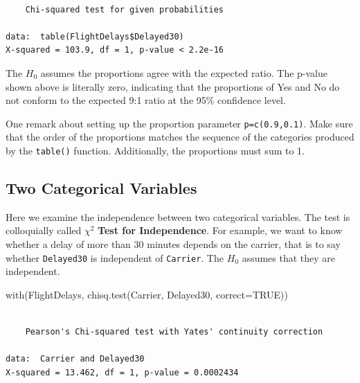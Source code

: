 \documentclass[
  letterpaper,
  DIV=11,
  numbers=noendperiod]{scrreprt}
\newenvironment{Shaded}{\begin{snugshade}}{\end{snugshade}}
\newcommand{\AttributeTok}[1]{\textcolor[rgb]{0.40,0.45,0.13}{#1}}
\newcommand{\ConstantTok}[1]{\textcolor[rgb]{0.56,0.35,0.01}{#1}}
\newcommand{\FloatTok}[1]{\textcolor[rgb]{0.68,0.00,0.00}{#1}}
\newcommand{\FunctionTok}[1]{\textcolor[rgb]{0.28,0.35,0.67}{#1}}
\newcommand{\NormalTok}[1]{\textcolor[rgb]{0.00,0.23,0.31}{#1}}
\newcommand{\SpecialCharTok}[1]{\textcolor[rgb]{0.37,0.37,0.37}{#1}}
\begin{document}
\begin{Shaded}
\end{Shaded}

\begin{verbatim}

    Chi-squared test for given probabilities

data:  table(FlightDelays$Delayed30)
X-squared = 103.9, df = 1, p-value < 2.2e-16
\end{verbatim}

The \(H_{0}\) assumes the proportions agree with the expected ratio. The
p-value shown above is literally zero, indicating that the proportions
of Yes and No do not conform to the expected 9:1 ratio at the 95\%
confidence level.

One remark about setting up the proportion parameter
\texttt{p=c(0.9,0.1)}. Make sure that the order of the proportions
matches the sequence of the categories produced by the \texttt{table()}
function. Additionally, the proportions must sum to 1.

\subsection{Two Categorical
Variables}\label{sec-04-x2-test-independence}

Here we examine the independence between two categorical variables. The
test is colloquially called \(\chi^{2}\) \textbf{Test for Independence}.
For example, we want to know whether a delay of more than 30 minutes
depends on the carrier, that is to say whether \texttt{Delayed30} is
independent of \texttt{Carrier}. The \(H_{0}\) assumes that they are
independent.

\begin{Shaded}
\begin{Highlighting}[]
\FunctionTok{with}\NormalTok{(FlightDelays, }\FunctionTok{chisq.test}\NormalTok{(Carrier, Delayed30, }\AttributeTok{correct=}\ConstantTok{TRUE}\NormalTok{))}
\end{Highlighting}
\end{Shaded}

\begin{verbatim}

    Pearson's Chi-squared test with Yates' continuity correction

data:  Carrier and Delayed30
X-squared = 13.462, df = 1, p-value = 0.0002434
\end{verbatim}
\end{document}
